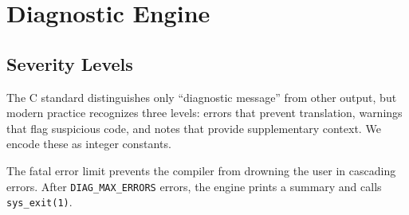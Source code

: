 \documentclass[11pt,a4paper,twoside,openright,DIV=15]{scrbook}
\theoremstyle{definition}
\theoremstyle{plain}
\theoremstyle{remark}
\begin{document}
%
%
%
%

\chapter{Diagnostic Engine}
\label{ch:diagnostics}

\section{Severity Levels}

The C standard distinguishes only ``diagnostic message'' from other
output, but modern practice recognizes three levels: errors that prevent
translation, warnings that flag suspicious code, and notes that provide
supplementary context.  We encode these as integer constants.

The fatal error limit prevents the compiler from drowning the user
in cascading errors.  After \texttt{DIAG\_MAX\_ERRORS} errors, the
engine prints a summary and calls \texttt{sys\_exit(1)}.
\end{document}
